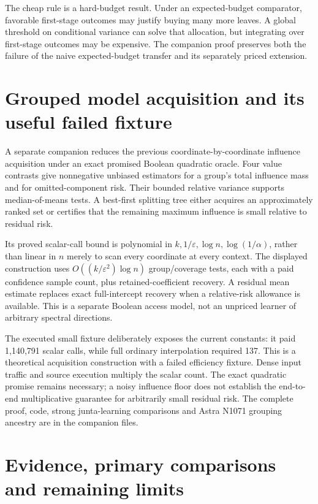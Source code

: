 \documentclass[11pt,a4paper]{article}
\begin{document}
The cheap rule is a hard-budget result. Under an expected-budget comparator, favorable first-stage outcomes may justify buying many more leaves. A global threshold on conditional variance can solve that allocation, but integrating over first-stage outcomes may be expensive. The companion proof preserves both the failure of the naive expected-budget transfer and its separately priced extension.

\section{Grouped model acquisition and its useful failed fixture}

A separate companion reduces the previous coordinate-by-coordinate influence acquisition under an exact promised Boolean quadratic oracle. Four value contrasts give nonnegative unbiased estimators for a group's total influence mass and for omitted-component risk. Their bounded relative variance supports median-of-means tests. A best-first splitting tree either acquires an approximately ranked set or certifies that the remaining maximum influence is small relative to residual risk.

Its proved scalar-call bound is polynomial in $k,1/\varepsilon,\log n,\log(1/\alpha)$, rather than linear in $n$ merely to scan every coordinate at every context. The displayed construction uses $O((k/\varepsilon^2)\log n)$ group/coverage tests, each with a paid confidence sample count, plus retained-coefficient recovery. A residual mean estimate replaces exact full-intercept recovery when a relative-risk allowance is available. This is a separate Boolean access model, not an unpriced learner of arbitrary spectral directions.

The executed small fixture deliberately exposes the current constants: it paid 1,140,791 scalar calls, while full ordinary interpolation required 137. This is a theoretical acquisition construction with a failed efficiency fixture. Dense input traffic and source execution multiply the scalar count. The exact quadratic promise remains necessary; a noisy influence floor does not establish the end-to-end multiplicative guarantee for arbitrarily small residual risk. The complete proof, code, strong junta-learning comparisons and Astra N1071 grouping ancestry are in the companion files.

\section{Evidence, primary comparisons and remaining limits}
\end{document}
